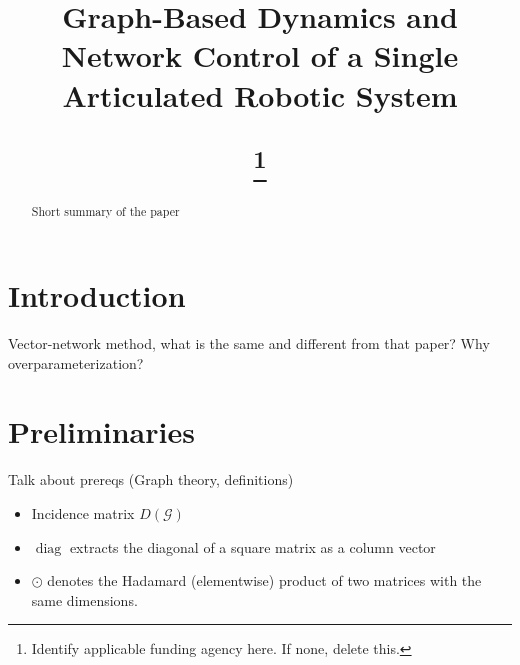 \documentclass[conference]{IEEEtran}
\DeclareMathOperator{\diag}{diag}
\begin{document}
\title{

Graph-Based Dynamics and Network Control of a Single Articulated Robotic System


\thanks{Identify applicable funding agency here. If none, delete this.}
}

\author{
\and
{}
}

\maketitle

\begin{abstract}
Short summary of the paper
\end{abstract}

\section{Introduction}
Vector-network method, what is the same and different from that paper?
Why overparameterization?

\section{Preliminaries}
Talk about prereqs (Graph theory, definitions)
\begin{itemize}
    \item Incidence matrix $D(\mathcal{G})$
    \item $\diag$ extracts the diagonal of a square matrix as a column vector
    \item $\odot$ denotes the Hadamard (elementwise) product of two matrices with the same dimensions.
\end{itemize}
\end{document}

